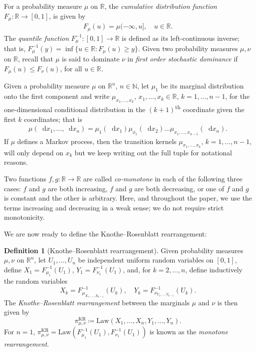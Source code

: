 \documentclass[oneside]{amsart}
\theoremstyle{definition}
\newtheorem{definition}[theorem]{Definition}
\newcommand{\Law}{\mathrm{Law}}
\newcommand{\N}{\mathbb N}
\newcommand{\R}{\mathbb R}
\newcommand{\kr}{\mathrm{KR}}
\newcommand{\dx}{\mathop{}\!\mathrm{d}x}
\def\R{{\mathbb R}}
\numberwithin{equation}{section}
\begin{document}
	For a probability measure $\mu$ on $\R$, the \emph{cumulative distribution function} $F_\mu\colon \R \to [0, 1]$, is given by 
	\begin{align}
		F_\mu(u)= \mu(-\infty, u],
		\quad u\in\R.
	\end{align} 
	The \emph{quantile function} $F_\mu^{-1}\colon [0,1]\to\R$ is defined as its left-continuous inverse; that is, $F_\mu^{-1}(y) = \inf\{u \in \R \colon F_\mu(u) \geq y\}$.
	Given two probability measures $\mu,\nu$ on $\R$, recall that $\mu$ is said to dominate $\nu$ in \emph{first order stochastic dominance} if $F_\mu(u)\le F_\nu(u)$, for all $u \in \R$. 

	Given a probability measure $\mu$ on $\R^n$, $n \in \N$, let $\mu_1$ be its marginal distribution onto the first component and write $\mu_{x_1, \dotsc, x_k}$, $x_1, \dotsc, x_k\in\R$, $k=1,\dots,n-1$, for the one-dimensional conditional distribution in the $(k+1)$\textsuperscript{th} coordinate given the first $k$ coordinates; that is
	\begin{align}\label{eq:disintegration_repr}
	\mu(\dx_1,\dots,\dx_n)=\mu_1(\dx_1)\mu_{x_1}(\dx_2)\dots\mu_{x_1,\dots,x_{n-1}}(\dx_n).
	\end{align}
	If $\mu$ defines a Markov process, then the transition kernels $\mu_{x_1, \dotsc, x_k}$, $k=1,\dots,n-1$, will only depend on $x_k$ but we keep writing out the full tuple for notational reasons. 
	
	Two functions $f, g\colon \R \to \R$ are called \emph{co-monotone} in each of the following three cases: $f$ and $g$ are both increasing, $f$ and $g$ are both decreasing, or one of $f$ and $g$ is constant and the other is arbitrary. Here, and throughout the paper, we use the terms increasing and decreasing in a weak sense; we do not require strict monotonicity.
	
	We are now ready to define the Knothe--Rosenblatt rearrangement:
	
\begin{definition}[Knothe--Rosenblatt rearrangement]\label{def:kr}
	Given probability measures $\mu, \nu$ on $\R^n$, let $U_1, \dotsc, U_n$ be independent uniform random variables on $[0, 1]$, define $X_1 = F_{\mu_1}^{-1}(U_1)$, $Y_1 = F_{\nu_1}^{-1}(U_1)$, and, for $k = 2, \dotsc, n$, define inductively the random variables
	\begin{equation}
		X_k = F^{-1}_{\mu_{X_1, \dotsc, X_{k - 1}}}(U_k), \quad Y_k = F^{-1}_{\nu_{Y_1, \dotsc, Y_{k - 1}}}(U_k).
	\end{equation}
	The \emph{Knothe--Rosenblatt rearrangement} between the marginals $\mu$ and $\nu$ is then given by 
	\[
	\pi^\kr_{\mu, \nu} \coloneqq \Law(X_1, \dotsc, X_n, Y_1, \dotsc, Y_n).
	\]
	For $n = 1$, $\pi^\kr_{\mu, \nu} = \Law(F_{\mu_1}^{-1}(U_1), F_{\nu_1}^{-1}(U_1))$ is known as the \emph{monotone rearrangement}.
\end{definition}
\end{document}
